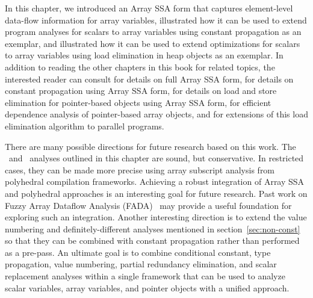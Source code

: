 
In this chapter,
we introduced an Array SSA form 
that captures element-level data-flow information for array variables,
illustrated how it can be used to extend program analyses for
scalars to array variables using constant propagation 
as an exemplar, and illustrated how it can be used to extend
optimizations for scalars to array variables using load elimination in
heap objects as
an exemplar.
In addition to reading the other chapters in this book for related
topics, the interested reader can consult \cite{KnSa98} for 
details on full Array SSA form, \cite{KnSa98b} for details on constant
propagation using Array SSA form, \cite{FiKS00} for
details on load and store elimination for pointer-based objects using
Array SSA form, \cite{SaFi01} for efficient dependence analysis of
pointer-based array objects, and \cite{BaSa09} for extensions of this load
elimination algorithm to parallel programs.


There are many possible directions for future research based on this
work.
The \ds\ and \dd\ analyses outlined in this chapter are sound, but
conservative.  In restricted cases, they can be made more precise using array subscript
analysis from polyhedral compilation frameworks.  Achieving a robust
integration of Array SSA and polyhedral approaches is an interesting goal for future
research.  Past work on Fuzzy Array Dataflow Analysis
(FADA)~\cite{BCF97} may provide a useful foundation for exploring such
an integration.
Another interesting direction is to extend the value numbering and 
definitely-different analyses mentioned in section~\ref{sec:non-const}
so that they can be combined with constant propagation
rather than performed as a pre-pass.
An ultimate goal is
to combine conditional constant, type propagation, value numbering, partial redundancy elimination,
and scalar replacement analyses within a single framework that can be
used to analyze scalar variables, array variables, and pointer objects
with a unified approach.
